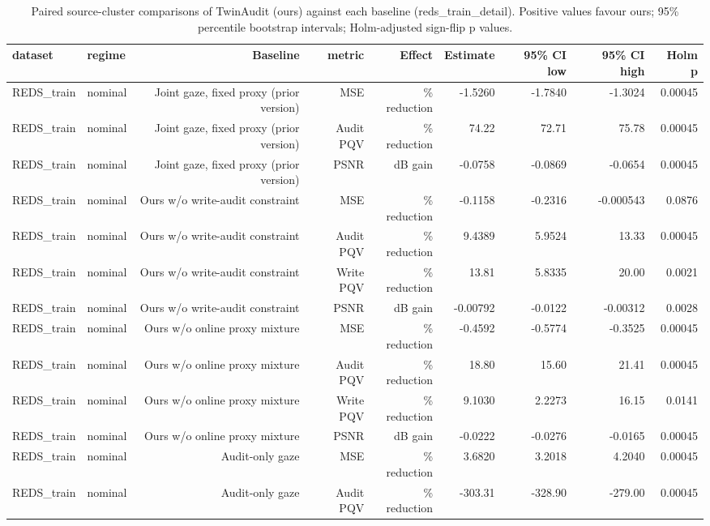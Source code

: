 \begin{table}[t]
\centering
\caption{Paired source-cluster comparisons of TwinAudit (ours) against each baseline (reds\_train\_detail). Positive values favour ours; 95\% percentile bootstrap intervals; Holm-adjusted sign-flip p values.}
\label{tab:paired_reds_train_detail}
\small
\begin{tabular}{llrrrrrrr}
\toprule
dataset & regime & Baseline & metric & Effect & Estimate & 95\% CI low & 95\% CI high & Holm p \\
\midrule
REDS\_train & nominal & Joint gaze, fixed proxy (prior version) & MSE & \% reduction & -1.5260 & -1.7840 & -1.3024 & 0.00045 \\
REDS\_train & nominal & Joint gaze, fixed proxy (prior version) & Audit PQV & \% reduction & 74.22 & 72.71 & 75.78 & 0.00045 \\
REDS\_train & nominal & Joint gaze, fixed proxy (prior version) & PSNR & dB gain & -0.0758 & -0.0869 & -0.0654 & 0.00045 \\
REDS\_train & nominal & Ours w/o write-audit constraint & MSE & \% reduction & -0.1158 & -0.2316 & -0.000543 & 0.0876 \\
REDS\_train & nominal & Ours w/o write-audit constraint & Audit PQV & \% reduction & 9.4389 & 5.9524 & 13.33 & 0.00045 \\
REDS\_train & nominal & Ours w/o write-audit constraint & Write PQV & \% reduction & 13.81 & 5.8335 & 20.00 & 0.0021 \\
REDS\_train & nominal & Ours w/o write-audit constraint & PSNR & dB gain & -0.00792 & -0.0122 & -0.00312 & 0.0028 \\
REDS\_train & nominal & Ours w/o online proxy mixture & MSE & \% reduction & -0.4592 & -0.5774 & -0.3525 & 0.00045 \\
REDS\_train & nominal & Ours w/o online proxy mixture & Audit PQV & \% reduction & 18.80 & 15.60 & 21.41 & 0.00045 \\
REDS\_train & nominal & Ours w/o online proxy mixture & Write PQV & \% reduction & 9.1030 & 2.2273 & 16.15 & 0.0141 \\
REDS\_train & nominal & Ours w/o online proxy mixture & PSNR & dB gain & -0.0222 & -0.0276 & -0.0165 & 0.00045 \\
REDS\_train & nominal & Audit-only gaze & MSE & \% reduction & 3.6820 & 3.2018 & 4.2040 & 0.00045 \\
REDS\_train & nominal & Audit-only gaze & Audit PQV & \% reduction & -303.31 & -328.90 & -279.00 & 0.00045 \\

\end{tabular}
\end{table}
